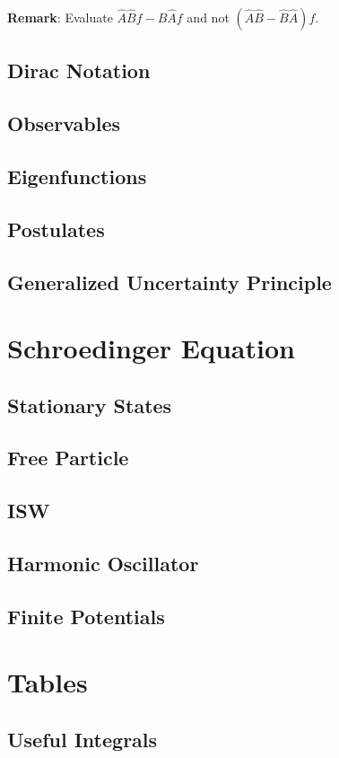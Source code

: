 \textbf{Remark}: Evaluate $\widehat{A}\widehat{B}f - \widehat{B}\widehat{A}f$ and not $(\widehat{A}\widehat{B} - \widehat{B}\widehat{A})f$.


\subsection{Dirac Notation}
\subsection{Observables}
\subsection{Eigenfunctions}
\subsection{Postulates}
\subsection{Generalized Uncertainty Principle}


\section{Schroedinger Equation}
\subsection{Stationary States}
\subsection{Free Particle}
\subsection{ISW}
\subsection{Harmonic Oscillator}
\subsection{Finite Potentials}

\section{Tables}
\subsection{Useful Integrals}
